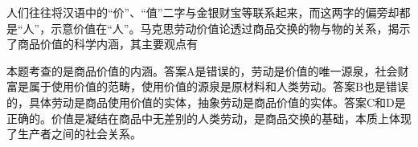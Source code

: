 \question 人们往往将汉语中的``价''、``值''二字与金银财宝等联系起来，而这两字的偏旁却都是``人''，示意价值在``人''。马克思劳动价值论透过商品交换的物与物的关系，揭示了商品价值的科学内涵，其主要观点有
\par{}
\begin{solution}本题考查的是商品价值的内涵。答案A是错误的，劳动是价值的唯一源泉，社会财富是属于使用价值的范畴，使用价值的源泉是原材料和人类劳动。答案B也是错误的，具体劳动是商品使用价值的实体，抽象劳动是商品价值的实体。答案C和D是正确的。价值是凝结在商品中无差别的人类劳动，是商品交换的基础，本质上体现了生产者之间的社会关系。
\end{solution}
